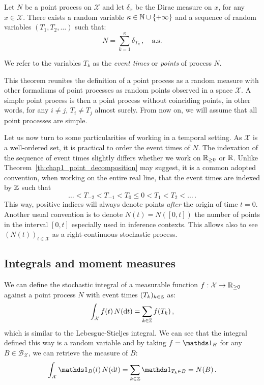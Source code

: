 \begin{theorem}{\parencite[Corollary 6.5]{Last2017}}\label{th:chap1_point_decomposition}

    Let $N$ be a point process on $\mathcal{X}$ and let $\delta_x$ be the Dirac measure on $x$, for any $x\in\mathcal{X}$.
    There exists a random variable $\kappa\in{\mathbb N}\cup \{+\infty\}$ and a sequence of random variables $(T_1, T_2, \ldots)$ such that:
    \[N = \sum_{k=1}^{\kappa}{\delta_{T_k}}\,,\quad \text{a.s.}\]  

    We refer to the variables $T_k$ as the \emph{event times} or \emph{points} of process $N$.
\end{theorem}
This theorem reunites the definition of a point process as a random measure with other formalisms of point processes as random points observed in a space $\mathcal{X}$.
A simple point process is then a point process without coinciding points, in other words, for any $i\neq j$, $T_i \neq T_j$ almost surely.
From now on, we will assume that all point processes are simple.

Let us now turn to some particularities of working in a temporal setting. As $\mathcal{X}$ is a well-ordered set, it is practical to order the event times of $N$.
The indexation of the sequence of event times slightly differs whether we work on ${\mathbb R}_{\geq 0}$ or ${\mathbb R}$. 
Unlike Theorem~\ref{th:chap1_point_decomposition} may suggest, it is a common adopted convention, when working on the entire real line, that the event times are indexed by ${\mathbb Z}$ such that \[\ldots < T_{-2} < T_{-1} < T_{0} \leq 0 < T_1 < T_2 < \ldots\,.\]
This way, positive indices will always denote points \emph{after} the origin of time $t=0$.
Another usual convention is to denote $N(t) = N([0, t])$ the number of points in the interval $[0, t]$ especially used in inference contexts.
This allows also to see $(N(t))_{t\in\mathcal{X}}$ as a right-continuous stochastic process.

\subsection{Integrals and moment measures}

We can define the stochastic integral of a measurable function $f:\mathcal{X}\to {\mathbb R}_{\geq 0}$ against a point process $N$ with event times $(T_k)_{k\in{\mathbb Z}}$ as:
\[\int_{\mathcal{X}}{f(t)\, N({\mathrm{d}} t)} = \sum_{k\in{\mathbb Z}}{f(T_k)}\,,\]
which is similar to the Lebesgue-Stieljes integral.
We can see that the integral defined this way is a random variable and by taking $f=\II_{B}$ for any $B\in\mathcal{B}_{\mathcal{X}}$, we can retrieve the measure of $B$:
\[\int_{\mathcal{X}}{\II_{B}(t)\, N(\dd t)} = \sum_{k\in\ZZ}{\II_{T_k \in B}} = N(B)\,.\]

